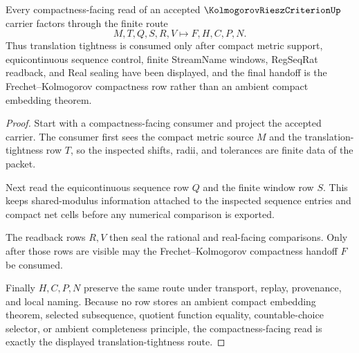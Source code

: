 \begin{theorem}
\label{thm:kolmogorov-riesz-translation-tightness-route}
Every compactness-facing read of an accepted $\KolmogorovRieszCriterionUp$ carrier factors through the finite route
$$
M,T,Q,S,R,V \longmapsto F,H,C,P,N .
$$
Thus translation tightness is consumed only after compact metric support, equicontinuous sequence control, finite StreamName windows, RegSeqRat readback, and Real sealing have been displayed, and the final handoff is the Frechet--Kolmogorov compactness row rather than an ambient compact embedding theorem.
\end{theorem}
\begin{proof}
Start with a compactness-facing consumer and project the accepted carrier. The consumer first sees the compact metric source $M$ and the translation-tightness row $T$, so the inspected shifts, radii, and tolerances are finite data of the packet.

Next read the equicontinuous sequence row $Q$ and the finite window row $S$. This keeps shared-modulus information attached to the inspected sequence entries and compact net cells before any numerical comparison is exported.

The readback rows $R,V$ then seal the rational and real-facing comparisons. Only after those rows are visible may the Frechet--Kolmogorov compactness handoff $F$ be consumed.

Finally $H,C,P,N$ preserve the same route under transport, replay, provenance, and local naming. Because no row stores an ambient compact embedding theorem, selected subsequence, quotient function equality, countable-choice selector, or ambient completeness principle, the compactness-facing read is exactly the displayed translation-tightness route.
\end{proof}


